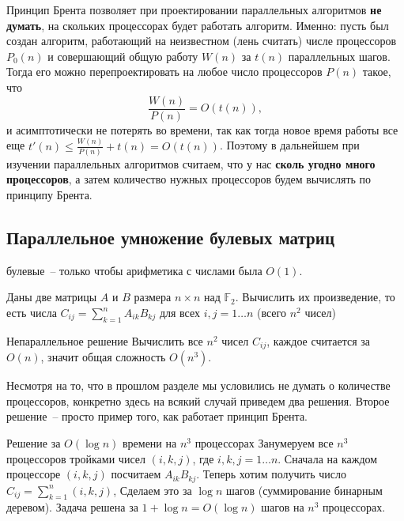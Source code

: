 \begin{nb*} Принцип Брента позволяет при проектировании параллельных алгоритмов \textbf{не думать}, на скольких процессорах будет работать алгоритм. Именно: пусть был создан алгоритм, работающий на неизвестном (лень считать) числе процессоров $P_0(n)$ и совершающий общую работу $W(n)$ за $t(n)$ параллельных шагов. Тогда его можно перепроектировать на любое число процессоров $P(n)$ такое, что $$\frac{W(n)}{P(n)} = O(t(n)),$$ и асимптотически не потерять во времени, так как тогда новое время работы все еще $t'(n) \leq \frac{W(n)}{P(n)} + t(n) = O(t(n))$. Поэтому в дальнейшем при изучении параллельных алгоритмов считаем, что у нас \textbf{сколь угодно много процессоров}, а затем количество нужных процессоров будем вычислять по принципу Брента.
\end{nb*}

\subsection{Параллельное умножение булевых матриц}
\begin{nb*} 
    булевые~-- только чтобы арифметика с числами была $O(1)$.
\end{nb*}

\begin{problem*}
	Даны две матрицы $A$ и $B$ размера $n\times n$ над $\mathbb F_2$. Вычислить их произведение, то есть числа $C_{ij} = \sum_{k=1}^n A_{ik}B_{kj}$  для всех $i, j=1\ldots n$ (всего $n^2$  чисел)
\end{problem*}

\begin{algodescription}{Непараллельное решение} 
    Вычислить все $n^2$ чисел $C_{ij}$, каждое считается за $O(n)$, значит общая сложность $O(n^3)$. 
\end{algodescription}

Несмотря на то, что в прошлом разделе мы условились не думать о количестве процессоров, конкретно здесь на всякий случай приведем два решения. Второе решение~-- просто пример того, как работает принцип Брента.

\begin{algodescription}{Решение за $O(\log n)$ времени на $n^3$ процессорах}
    Занумеруем все $n^3$ процессоров тройками чисел $(i, k, j)$, где $i,k,j=1\ldots n$. Сначала на каждом процессоре $(i, k, j)$ посчитаем $A_{ik}B_{kj}$. Теперь хотим получить число $C_{ij} = \sum_{k=1}^n (i, k, j)$, Сделаем это за $\log n$ шагов (суммирование бинарным деревом). Задача решена за $1+\log n = O(\log n) $ шагов на $n^3$ процессорах. 
\end{algodescription}

